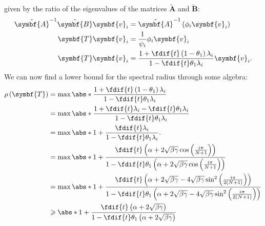 \documentclass{article}
\begin{document}
given by the ratio of the eigenvalues of the matrices \(\tilde{\symbf{A}}\)
and \(\tilde{\symbf{B}}\):
\begin{align*}
    \tilde{\symbf{A}}^{-1} \tilde{\symbf{B}} \symbf{v}_i & = \tilde{\symbf{A}}^{-1} \left( \phi_i \symbf{v}_i \right)                                                \\
    \symbf{T} \symbf{v}_i                                & = \frac{1}{\psi_i} \phi_i \symbf{v}_i                                                                     \\
    \symbf{T} \symbf{v}_i                                & = \frac{1 + \fdif{t} \left( 1 - \theta_1 \right) \lambda_i}{1 - \fdif{t} \theta_1 \lambda_i} \symbf{v}_i.
\end{align*}
We can now find a lower bound for the spectral radius through some
algebra:
\begin{align*}
    \rho\left( \symbf{T} \right) & = \max \abs*{\frac{1 + \fdif{t} \left( 1 - \theta_1 \right) \lambda_i}{1 - \fdif{t} \theta_1 \lambda_i}}                                                                                                                                                                                                             \\
                                 & = \max \abs*{\frac{1 + \fdif{t} \lambda_i - \fdif{t} \theta_1 \lambda_i}{1 - \fdif{t} \theta_1 \lambda_i}}                                                                                                                                                                                                           \\
                                 & = \max \abs*{1 + \frac{\fdif{t} \lambda_i}{1 - \fdif{t} \theta_1 \lambda_i}}.                                                                                                                                                                                                                                        \\
                                 & = \max \abs*{1 + \frac{\fdif{t} \left( \alpha + 2 \sqrt{\beta \gamma} \cos\left( \frac{i \pi}{N+1} \right) \right)}{1 - \fdif{t} \theta_1 \left( \alpha + 2 \sqrt{\beta \gamma} \cos\left( \frac{i \pi}{N+1} \right) \right)}}                                                                                       \\
                                 & = \max \abs*{1 + \frac{\fdif{t} \left( \alpha + 2 \sqrt{\beta \gamma} - 4 \sqrt{\beta \gamma} \sin^2\left( \frac{i \pi}{2 \left( N+1 \right)} \right) \right)}{1 - \fdif{t} \theta_1 \left( \alpha + 2 \sqrt{\beta \gamma} - 4 \sqrt{\beta \gamma} \sin^2\left( \frac{i \pi}{2 \left( N+1 \right)} \right) \right)}} \\
                                 & \geqslant \abs*{1 + \frac{\fdif{t} \left( \alpha + 2 \sqrt{\beta \gamma} \right)}{1 - \fdif{t} \theta_1 \left( \alpha + 2 \sqrt{\beta \gamma} \right)}}
\end{align*}
\end{document}
